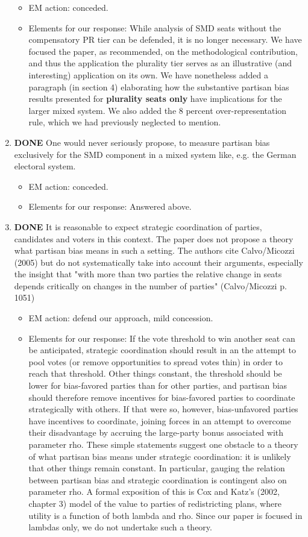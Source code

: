 \documentclass{article}
\begin{document}
\begin{enumerate}
\label{sec:orgheadline22}
\begin{itemize}
\item EM action: conceded.
\item Elements for our response: While analysis of SMD seats without the compensatory PR tier can be defended, it is no longer necessary. We have focused the paper, as recommended, on the methodological contribution, and thus the application the plurality tier serves as an illustrative (and interesting) application on its own. We have nonetheless added a paragraph (in section 4) elaborating how the substantive partisan bias results presented for \textbf{plurality seats only} have implications for the larger mixed system. We also added the 8 percent over-representation rule, which we had previously neglected to mention.
\end{itemize}
\item {\bfseries\sffamily DONE} One would never seriously propose, to measure partisan bias exclusively for the SMD component in a mixed system like, e.g. the German electoral system.
\label{sec:orgheadline23}
\begin{itemize}
\item EM action: conceded.
\item Elements for our response: Answered above.
\end{itemize}
\item {\bfseries\sffamily DONE} It is reasonable to expect strategic coordination of parties, candidates and voters in this context. The paper does not propose a theory what partisan bias means in such a setting. The authors cite Calvo/Micozzi (2005) but do not systematically take into account their arguments, especially the insight that "with more than two parties the relative change in seats depends critically on changes in the number of parties" (Calvo/Micozzi p. 1051)
\label{sec:orgheadline24}
\begin{itemize}
\item EM action: defend our approach, mild concession.
\item Elements for our response:  If the vote threshold to win another seat can be anticipated, strategic coordination should result in an the attempt to pool votes (or remove opportunities to spread votes thin) in order to reach that threshold. Other things constant, the threshold should be lower for bias-favored parties than for other parties, and partisan bias should therefore remove incentives for bias-favored parties to coordinate strategically with others. If that were so, however, bias-unfavored parties have incentives to coordinate, joining forces in an attempt to overcome their disadvantage by accruing the large-party bonus associated with parameter rho. These simple statements suggest one obstacle to a theory of what partisan bias means under strategic coordination: it is unlikely that other things remain constant. In particular, gauging the relation between partisan bias and strategic coordination is contingent also on parameter rho. A formal exposition of this is Cox and Katz's (2002, chapter 3) model of the value to parties of redistricting plans, where utility is a function of both lambda and rho. Since our paper is focused in lambdas only, we do not undertake such a theory.

\end{itemize}
\end{enumerate}
\end{document}
